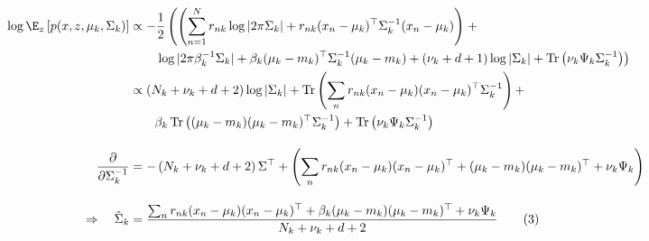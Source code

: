 \documentclass[11pt]{article}
\DeclareMathOperator{\Trace}{Tr}
\def\Tr{^\top}
\begin{document}
\begin{align*}
\log \E_z \left[ p(x, z, \mu_k, \Sigma_k)\right] & \propto  -\frac{1}{2}\left(\left(\sum_{n=1}^N r_{nk}\log|2\pi\Sigma_k| + r_{nk}(x_n - \mu_k)\Tr\Sigma_k^{-1}(x_n - \mu_k) \right) \right.+\\
& \left. \qquad  \log|2\pi\beta_k^{-1}\Sigma_k| +  \beta_k(\mu_k - m_k)\Tr\Sigma_k^{-1}(\mu_k - m_k) + (\nu_k + d + 1)\log|\Sigma_k| + \Trace\left(\nu_k\Psi_k\Sigma_k^{-1}\right)
\right)\\
& \propto \left(N_k + \nu_k + d + 2\right) \log|\Sigma_k| + \Trace\left(\sum_n r_{nk} (x_n - \mu_k)(x_n-\mu_k)\Tr \Sigma_k^{-1}\right) +\\
& \qquad  \beta_k\Trace\left((\mu_k - m_k)(\mu_k - m_k)\Tr\Sigma_k^{-1}\right) + \Trace\left(\nu_k\Psi_k\Sigma_k^{-1}\right)\\[10pt]
\frac{\partial}{\partial \Sigma_k^{-1}} & = -\left(N_k + \nu_k + d + 2\right)\Sigma\Tr + \left(\sum_n r_{nk} (x_n - \mu_k)(x_n-\mu_k)\Tr + (\mu_k - m_k)(\mu_k - m_k)\Tr + \nu_k\Psi_k\right)\\[10pt]
\Rightarrow \quad \hat\Sigma_k &=\frac{\sum_n r_{nk} (x_n - \mu_k)(x_n-\mu_k)\Tr + \beta_k(\mu_k - m_k)(\mu_k - m_k)\Tr + \nu_k\Psi_k}{N_k + \nu_k + d + 2} \tag{3}\label{est_sigma}
\end{align*}
\end{document}
